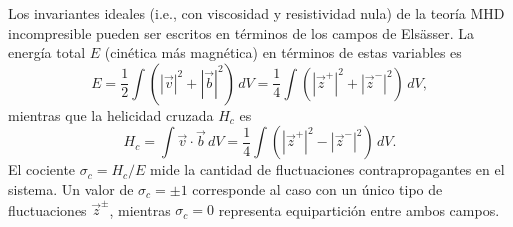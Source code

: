 Los invariantes ideales (i.e., con viscosidad y resistividad nula) de la teoría MHD incompresible pueden ser escritos en términos de los campos de Els\"asser.
La energía total $E$ (cinética más magnética) en términos de estas variables es
\begin{equation}
E = \frac{1}{2}\int{\left(\left|\vec{v}\right|^2 +
    \left|\vec{b}\right|^2 \right)\,dV} =
    \frac{1}{4}\int{\left(\left|\vec{z}^+\right|^2 +
    \left|\vec{z}^-\right|^2 \right)\,dV},
\label{eq4:ener}
\end{equation}
mientras que la helicidad cruzada $H_c$ es
\begin{equation}
H_c = \int{\vec{v}\cdot\vec{b} \, dV} =
    \frac{1}{4}\int{\left(\left|\vec{z}^+\right|^2 
    - \left|\vec{z}^-\right|^2 \right)\,dV} .
\label{eq4:cross}
\end{equation}
El cociente $\sigma_c = H_c/E$ mide la cantidad de fluctuaciones
contrapropagantes en el sistema. Un valor de $\sigma_c = \pm 1$
corresponde al caso con un único tipo de fluctuaciones $\vec{z}^\pm$,
mientras $\sigma_c=0$ representa equipartición entre ambos campos.

